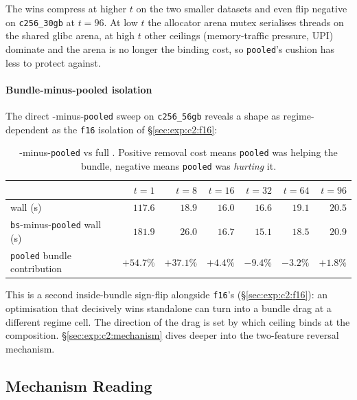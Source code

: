 The wins compress at higher $t$ on the two smaller datasets and even flip negative on \texttt{c256\_30gb} at $t{=}96$. At low $t$ the allocator arena mutex serialises threads on the shared glibc arena, at high $t$ other ceilings (memory-traffic pressure, UPI) dominate and the arena is no longer the binding cost, so \texttt{pooled}'s cushion has less to protect against.

\paragraph{Bundle-minus-pooled isolation}

The direct \bcombo{}-minus-\texttt{pooled} sweep on \texttt{c256\_56gb} reveals a shape as regime-dependent as the \texttt{f16} isolation of §\ref{sec:exp:c2:f16}:

\begin{table}[H]
  \centering
  \caption[\bcombo{}-minus-\texttt{pooled} isolation.]{\bcombo{}-minus-\texttt{pooled} vs full \bcombo{}. Positive removal cost means \texttt{pooled} was helping the bundle, negative means \texttt{pooled} was \emph{hurting} it.}
  \label{tab:pooled_isolation}
  \footnotesize
  \begin{tabular}{lrrrrrr}
    \toprule
    & $t{=}1$ & $t{=}8$ & $t{=}16$ & $t{=}32$ & $t{=}64$ & $t{=}96$ \\
    \midrule
    \bcombo{} wall (s)          & $117.6$ & $18.9$ & $16.0$ & $16.6$ & $19.1$ & $20.5$ \\
    \texttt{bs}-minus-\texttt{pooled} wall (s) & $181.9$ & $26.0$ & $16.7$ & $15.1$ & $18.5$ & $20.9$ \\
    \texttt{pooled} bundle contribution & $+54.7\%$ & $+37.1\%$ & $+4.4\%$ & $\mathbf{-9.4\%}$ & $\mathbf{-3.2\%}$ & $+1.8\%$ \\
    \bottomrule
  \end{tabular}
\end{table}

This is a second inside-bundle sign-flip alongside \texttt{f16}'s (§\ref{sec:exp:c2:f16}): an optimisation that decisively wins standalone can turn into a bundle drag at a different regime cell. The direction of the drag is set by which ceiling binds at the composition. §\ref{sec:exp:c2:mechanism} dives deeper into the two-feature reversal mechanism.

\subsection{Mechanism Reading\label{sec:exp:c2:mechanism}}

